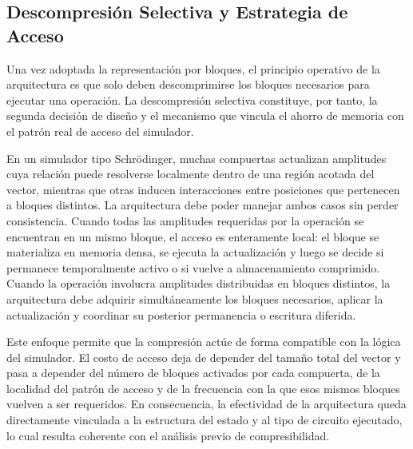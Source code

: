 \subsection{Descompresión Selectiva y Estrategia de Acceso}

Una vez adoptada la representación por bloques, el principio operativo de la arquitectura es que solo deben descomprimirse los bloques necesarios
para ejecutar una operación. La descompresión selectiva constituye, por tanto, la segunda decisión de diseño y el mecanismo que vincula el ahorro
de memoria con el patrón real de acceso del simulador.

En un simulador tipo Schrödinger, muchas compuertas actualizan amplitudes cuya relación puede resolverse localmente dentro de una región acotada del
vector, mientras que otras inducen interacciones entre posiciones que pertenecen a bloques distintos. La arquitectura debe poder manejar ambos
casos sin perder consistencia. Cuando todas las amplitudes requeridas por la operación se encuentran en un mismo bloque, el acceso es enteramente
local: el bloque se materializa en memoria densa, se ejecuta la actualización y luego se decide si permanece temporalmente activo o si vuelve a
almacenamiento comprimido. Cuando la operación involucra amplitudes distribuidas en bloques distintos, la arquitectura debe adquirir
simultáneamente los bloques necesarios, aplicar la actualización y coordinar su posterior permanencia o escritura diferida.

Este enfoque permite que la compresión actúe de forma compatible con la lógica del simulador. El costo de acceso deja de depender del tamaño total
del vector y pasa a depender del número de bloques activados por cada compuerta, de la localidad del patrón de acceso y de la frecuencia con la que
esos mismos bloques vuelven a ser requeridos. En consecuencia, la efectividad de la arquitectura queda directamente vinculada a la estructura del
estado y al tipo de circuito ejecutado, lo cual resulta coherente con el análisis previo de compresibilidad.

